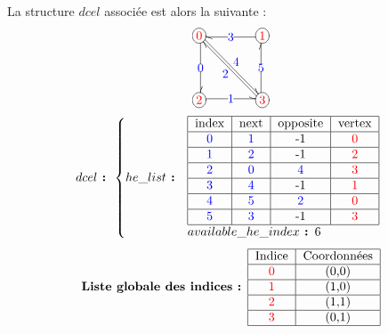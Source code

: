 \documentclass[]{article}
\begin{document}
La structure $dcel$ associée est alors la suivante :
\[
	\entrymodifiers={+[o][F]}
	\renewcommand{\labelstyle}{\textstyle}
	\xymatrix@=4em @L=.25ex{
		{\color{red}0}
		\ar @<.25ex> @^{->} [d] |{\color{blue}0}
		\ar @<.25ex> @^{->} [dr] ^{\color{blue}4}
		& {\color{red}1}
		\ar @<.25ex> @^{->} [l] |{\color{blue}3}
		\\ {\color{red}2}
		\ar @<.25ex> @^{->} [r] |{\color{blue}1}
		& {\color{red}3}
		\ar @<.25ex> @^{->} [ul] ^{\color{blue}2}
		\ar @<.25ex> @^{->} [u] |{\color{blue}5}
	}
\]
\[
	dcel\textbf{ : }
	\left\{
		he\_list\textbf{ : }
		\begin{array}{l}
			\begin{tabular}{|c|c|c|c|}
				\hline
				index & next & opposite & vertex \\
				\hline
				\color{blue}0 & \color{blue}1 & -1 & \color{red}0 \\
				\hline
				\color{blue}1 & \color{blue}2 & -1 & \color{red}2 \\
				\hline
				\color{blue}2 & \color{blue}0 & \color{blue}4 & \color{red}3 \\
				\hline
				\color{blue}3 & \color{blue}4 & -1 & \color{red}1 \\
				\hline
				\color{blue}4 & \color{blue}5 & \color{blue}2 & \color{red}0 \\
				\hline
				\color{blue}5 & \color{blue}3 & -1 & \color{red}3 \\
				\hline
			\end{tabular}\\
			available\_he\_index\textbf{ : }6
		\end{array}
	\right.
\]
\[
	\textbf{Liste globale des indices : }
	\begin{tabular}{|c|c|}
		\hline
		Indice & Coordonnées \\
		\hline
		\color{red}0 & (0,0) \\
		\hline
		\color{red}1 & (1,0) \\
		\hline
		\color{red}2 & (1,1) \\
		\hline
		\color{red}3 & (0,1) \\
		\hline
	\end{tabular}
\]
\end{document}
